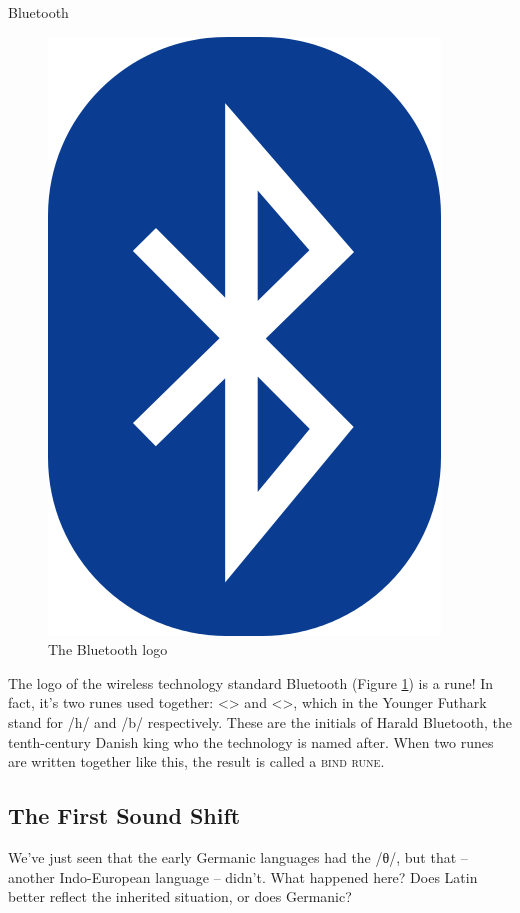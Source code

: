 \begin{sourcebox}{Bluetooth}
\begin{figure}
        \includegraphics[scale=0.08]{chapters/img/393px-Bluetooth.png}
    \caption{The Bluetooth logo}
    \label{fig:bluetooth}
\end{figure}
The logo of the wireless technology standard Bluetooth (Figure \ref{fig:bluetooth}) is a rune! In fact, it's two runes used together: <> and <>, which in the Younger Futhark stand for /h/ and /b/ respectively. These are the initials of Harald Bluetooth, the tenth-century Danish king who the technology is named after. When two runes are written together like this, the result is called a \textsc{bind rune}.
\end{sourcebox}


\subsection{The First Sound Shift}
We've just seen that the early Germanic languages had the  /θ/, but that  -- another Indo-European language -- didn't. What happened here? Does Latin better reflect the inherited  situation, or does Germanic?

